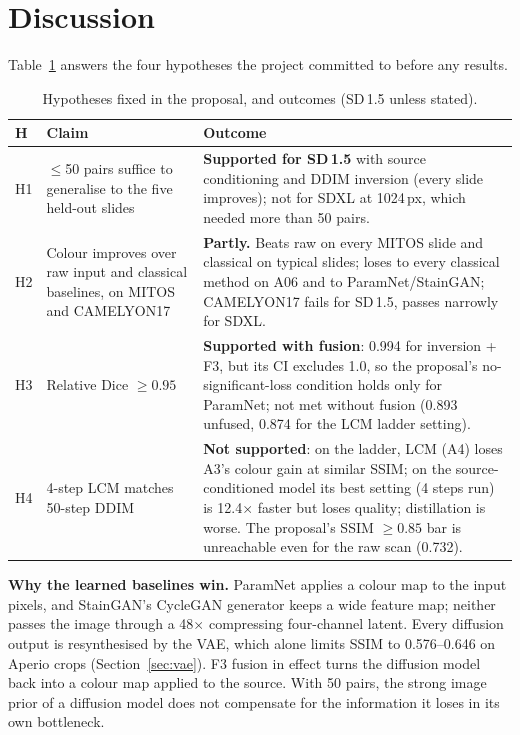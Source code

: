 \section{Discussion}
\label{sec:discussion}

Table~\ref{tab:hyp} answers the four hypotheses the project committed to before any results.

\begin{table}[t]
\centering
\caption{Hypotheses fixed in the proposal, and outcomes (SD\,1.5 unless stated).}
\label{tab:hyp}
\footnotesize
\setlength{\tabcolsep}{3pt}
\begin{tabular}{p{0.4cm}p{2.7cm}p{5.0cm}}
\toprule
H & Claim & Outcome\\
\midrule
H1 & $\leq$50 pairs suffice to generalise to the five held-out slides &
\textbf{Supported for SD\,1.5} with source conditioning and DDIM inversion (every slide improves);
not for SDXL at 1024\,px, which needed more than 50 pairs.\\
\midrule
H2 & Colour improves over raw input and classical baselines, on MITOS and CAMELYON17 &
\textbf{Partly.} Beats raw on every MITOS slide and classical on typical slides; loses to every classical method on A06 and to
ParamNet/StainGAN; CAMELYON17 fails for SD\,1.5, passes narrowly for SDXL.\\
\midrule
H3 & Relative Dice $\geq 0.95$ &
\textbf{Supported with fusion}: 0.994 for inversion + F3, but its CI excludes 1.0, so the proposal's
no-significant-loss condition holds only for ParamNet; not met without fusion (0.893 unfused, 0.874
for the LCM ladder setting).\\
\midrule
H4 & 4-step LCM matches 50-step DDIM &
\textbf{Not supported}: on the ladder, LCM (A4) loses A3's colour gain at similar SSIM; on the
source-conditioned model its best setting (4 steps run) is 12.4$\times$ faster but loses quality;
distillation is worse. The proposal's SSIM $\geq 0.85$ bar is unreachable even for the raw scan (0.732).\\
\bottomrule
\end{tabular}
\end{table}

\textbf{Why the learned baselines win.} ParamNet applies a colour map to the input pixels, and
StainGAN's CycleGAN generator keeps a wide feature map; neither passes the image through a 48$\times$ compressing four-channel latent. Every diffusion output is resynthesised by the VAE, which alone limits SSIM to
0.576--0.646 on Aperio crops (Section~\ref{sec:vae}). F3 fusion in effect turns the diffusion model back
into a colour map applied to the source. With 50 pairs, the strong image prior
of a diffusion model does not compensate for the information it loses in its own bottleneck.

